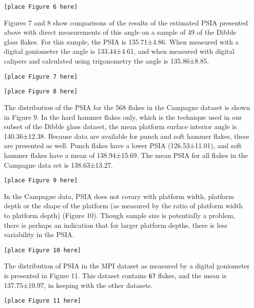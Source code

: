 \documentclass[10pt,letterpaper]{article}
\begin{document}
\begin{verbatim}
[place Figure 6 here]
\end{verbatim}

Figures 7 and 8 show comparisons of the results of the estimated PSIA
presented above with direct measurements of this angle on a sample of 49
of the Dibble glass flakes. For this sample, the PSIA is 135.71±4.86.
When measured with a digital goniometer the angle is 133.44±4.61, and
when measured with digital calipers and calculated using trigonometry
the angle is 135.86±8.85.

\begin{verbatim}
[place Figure 7 here]
\end{verbatim}

\begin{verbatim}
[place Figure 8 here]
\end{verbatim}

The distribution of the PSIA for the 568 flakes in the Campagne dataset
is shown in Figure 9. In the hard hammer flakes only, which is the
technique used in our subset of the Dibble glass dataset, the mean
platform surface interior angle is 140.36±12.38. Because data are
available for punch and soft hammer flakes, these are presented as well.
Punch flakes have a lower PSIA (126.53±11.01), and soft hammer flakes
have a mean of 138.94±15.69. The mean PSIA for all flakes in the
Campagne data set is 138.63±13.27.

\begin{verbatim}
[place Figure 9 here]
\end{verbatim}

In the Campagne data, PSIA does not covary with platform width, platform
depth or the shape of the platform (as measured by the ratio of platform
width to platform depth) (Figure 10). Though sample size is potentially
a problem, there is perhaps an indication that for larger platform
depths, there is less variability in the PSIA.

\begin{verbatim}
[place Figure 10 here]
\end{verbatim}

The distribution of PSIA in the MPI dataset as measured by a digital
goniometer is presented in Figure 11. This dataset contains \texttt{67}
flakes, and the mean is 137.75±10.97, in keeping with the other
datasets.

\begin{verbatim}
[place Figure 11 here]
\end{verbatim}
\end{document}
